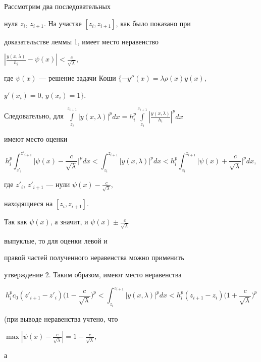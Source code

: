 \begin{pf} 


Рассмотрим два последовательных 


нуля $z_i$, $z_{i+1}$. На участке $[z_i,z_{i+1}]$, как было показано при 


доказательстве леммы 1, имеет место неравенство 


$|\frac{y(x,\lambda)}{h_i}-\psi(x)|<\frac{c}{\sqrt{\lambda}}$, 


где $\psi(x)$ --- решение задачи Коши $\{-y''(x)=\lambda\rho(x)y(x)$, 


$y'(x_i)=0$, $y(x_i)=1\}$. 


Следовательно, для $\int\limits^{z_{i+1}}_{z_i} |y(x,\lambda)|^p 


dx=h^p_i \int\limits^{z_{i+1}}_{z_i} |\frac{y(x,\lambda)}{h_i}|^p dx$ 


имеют место оценки 


$$ 


h^p_i\int^{z'_{i+1}}_{z'_i}\bigg|\psi(x)-\frac{c}{\sqrt{\lambda}} 


\bigg|^p dx<\int^{z_{i+1}}_{z_i} |y(x,\lambda)|^p dx <h^p_i 


\int^{z_{i+1}}_{z_i}\bigg|\psi(x)+\frac{c}{\sqrt{\lambda}} 


\bigg|^p dx, 


$$ 


где $z'_i$, $z'_{i+1}$ --- нули $\psi(x)-\frac{c}{\sqrt{\lambda}}$, 


находящиеся на $[z_i,z_{i+1}]$. 


Так как $\psi(x)$, а значит, и $\psi(x)\pm\frac{c}{\sqrt{\lambda}}$ 


выпуклые, то для оценки левой и 


правой частей полученного неравенства можно применить 


утверждение 2. Таким образом, имеют место неравенства 


$$ 


h^p_i c_0(z'_{i+1}-z'_i)\bigg(1-\frac{c}{\sqrt{\lambda}} \bigg)^p 


<\int^{z_{i+1}}_{z_i} |y(x,\lambda)|^p dx < h^p_i(z_{i+1}-z_i) 


\bigg(1+\frac{c}{\sqrt{\lambda}} \bigg)^p 


$$ 


(при выводе неравенства учтено, что 


$\max|\psi(x)-\frac{c}{\sqrt{\lambda}}|=1- \frac{c}{\sqrt{\lambda}}$,


а 



\end{pf}
